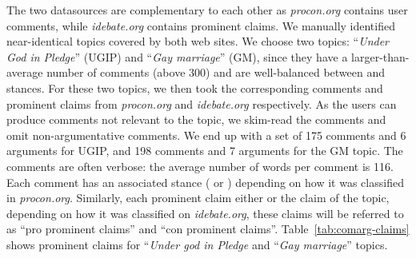 The two datasources are complementary to each other as \textit{procon.org}
contains user comments, while \textit{idebate.org} contains prominent claims. 
We manually identified near-identical topics covered by both web sites. 
We choose two topics: ``\textit{Under God in Pledge}'' (UGIP) and 
``\textit{Gay marriage}'' (GM), since
they have a larger-than-average number of comments (above 300) and are 
well-balanced between  and  stances. 
For these two topics, we then took the corresponding comments and prominent claims
from \textit{procon.org} and \textit{idebate.org} respectively. 
As the users can produce comments not relevant to the topic, we skim-read 
the comments and omit non-argumentative comments.  We end up with a set of 175
comments and 6 arguments for UGIP, and 198 comments and 7 arguments for the GM
topic. 
The comments are often verbose: the average number of words per comment is 116. 
Each comment has an associated stance ( or ) depending on 
how it was classified in \textit{procon.org}. 
Similarly, each prominent claim either  or  the claim of the topic,
depending on how it was classified on \textit{idebate.org}, these claims will be referred to 
as ``pro prominent claims'' and ``con prominent claims''. 
Table~\ref{tab:comarg-claims} shows prominent claims for ``\emph{Under god in Pledge}
and ``\textit{Gay marriage}'' topics. 


